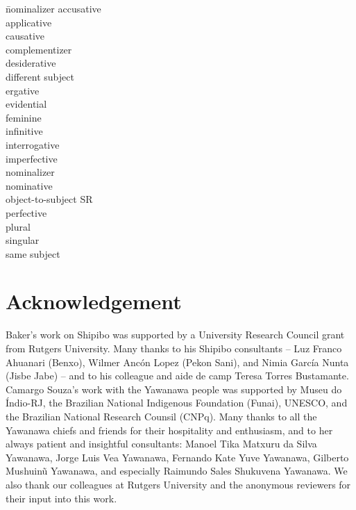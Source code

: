 \documentclass[output=paper]{langscibook}
\begin{document}
\begin{multicols}{2}
\begin{tabbing}
 \= nominalizer\kill
{}  \> accusative\\
 \> applicative\\
 \> causative\\
 \> complementizer\\
  \> desiderative\\
   \> different subject\\
  \> ergative\\
   \> evidential\\
    \> feminine\\
  \> infinitive\\
  \> interrogative\\
 \> imperfective\\
 \> nominalizer\\
  \> nominative\\
   \> object-to-subject SR\\
  \> perfective\\
   \> plural\\
   \> singular\\
   \> same subject\\    
\end{tabbing}
\end{multicols}

\section*{Acknowledgement}
Baker's work on Shipibo was supported by a University Research Council grant from Rutgers University. Many thanks to his Shipibo consultants -- Luz Franco Ahuanari (Benxo), Wilmer Ancón Lopez (Pekon Sani), and Nimia García Nunta (Jisbe Jabe) -- and to his colleague and aide de camp Teresa Torres Bustamante. Camargo Souza's work with the Yawanawa people was supported by Museu do Índio-RJ, the Brazilian National Indigenous Foundation (Funai), UNESCO, and the Brazilian National Research Counsil (CNPq). Many thanks to all the Yawanawa chiefs and friends for their hospitality and enthusiasm, and to her always patient and insightful consultants: Manoel Tika Matxuru da Silva Yawanawa, Jorge Luis Vea Yawanawa, Fernando Kate Yuve Yawanawa, Gilberto Mushuinũ Yawanawa, and especially Raimundo Sales Shukuvena Yawanawa. We also thank our colleagues at Rutgers University and the anonymous reviewers for their input into this work.

\printbibliography[heading=subbibliography,notkeyword=this]
\end{document}
